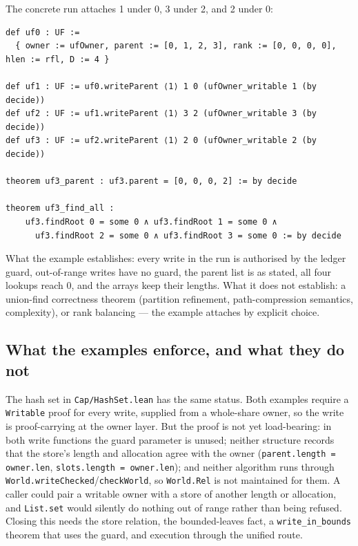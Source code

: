 \documentclass[10pt,a4paper]{article}
\newcommand{\file}[1]{\texttt{\small #1}}
\begin{document}
The concrete run attaches 1 under 0, 3 under 2, and 2 under 0:

\begin{lstlisting}[caption={The run and its results.}]
def uf0 : UF :=
  { owner := ufOwner, parent := [0, 1, 2, 3], rank := [0, 0, 0, 0], hlen := rfl, D := 4 }

def uf1 : UF := uf0.writeParent ⟨1⟩ 1 0 (ufOwner_writable 1 (by decide))
def uf2 : UF := uf1.writeParent ⟨1⟩ 3 2 (ufOwner_writable 3 (by decide))
def uf3 : UF := uf2.writeParent ⟨1⟩ 2 0 (ufOwner_writable 2 (by decide))

theorem uf3_parent : uf3.parent = [0, 0, 0, 2] := by decide

theorem uf3_find_all :
    uf3.findRoot 0 = some 0 ∧ uf3.findRoot 1 = some 0 ∧
      uf3.findRoot 2 = some 0 ∧ uf3.findRoot 3 = some 0 := by decide
\end{lstlisting}

What the example establishes: every write in the run is authorised by the ledger
guard, out-of-range writes have no guard, the parent list is as stated, all four
lookups reach 0, and the arrays keep their lengths. What it does not establish: a
union-find correctness theorem (partition refinement, path-compression semantics,
complexity), or rank balancing --- the example attaches by explicit choice.

\subsection*{What the examples enforce, and what they do not}

The hash set in \file{Cap/HashSet.lean} has the same status. Both examples require
a \texttt{Writable} proof for every write, supplied from a whole-share owner, so
the write is proof-carrying at the owner layer. But the proof is not yet
load-bearing: in both write functions the guard parameter is unused; neither
structure records that the store's length and allocation agree with the owner
(\texttt{parent.length = owner.len}, \texttt{slots.length = owner.len}); and
neither algorithm runs through \texttt{World.writeChecked}/\texttt{checkWorld}, so
\texttt{World.Rel} is not maintained for them. A caller could pair a writable owner
with a store of another length or allocation, and \texttt{List.set} would silently
do nothing out of range rather than being refused. Closing this needs the store
relation, the bounded-leaves fact, a \texttt{write\_in\_bounds} theorem that uses
the guard, and execution through the unified route.
\end{document}
